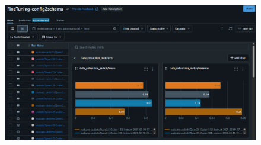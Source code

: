 \documentclass[aspectratio=169]{beamer}
\begin{document}
\begin{frame}

  \begin{figure}
    \includegraphics[width = \textwidth]{images/mlflow.png}
  \end{figure}

\end{frame}
\end{document}
